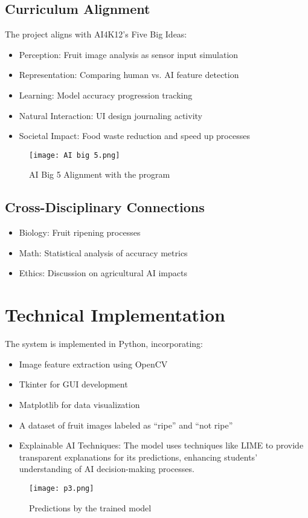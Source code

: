 \documentclass[conference]{IEEEtran}
\begin{document}
\subsection{Curriculum Alignment}
The project aligns with AI4K12's Five Big Ideas:
\begin{itemize}
    \item Perception: Fruit image analysis as sensor input simulation
    \item Representation: Comparing human vs. AI feature detection
    \item Learning: Model accuracy progression tracking
    \item Natural Interaction: UI design journaling activity
    \item Societal Impact: Food waste reduction and speed up processes
\end{itemize}
\begin{figure}[h]
    \centering
    \texttt{[image: AI big 5.png]}  
    \caption{AI Big 5 Alignment with the program}
    \label{fig:AI Big 5} 
\end{figure}
\subsection{Cross-Disciplinary Connections}
\begin{itemize}
    \item Biology: Fruit ripening processes
    \item Math: Statistical analysis of accuracy metrics
    \item Ethics: Discussion on agricultural AI impacts
\end{itemize}

\section{Technical Implementation}
The system is implemented in Python, incorporating:
\begin{itemize}
    \item Image feature extraction using OpenCV
    \item Tkinter for GUI development
    \item Matplotlib for data visualization
    \item A dataset of fruit images labeled as ``ripe'' and ``not ripe''
    \item Explainable AI Techniques: The model uses techniques like LIME to provide transparent explanations for its predictions, enhancing students' understanding of AI decision-making processes.
\end{itemize}
\begin{figure}[h]
    \centering
    \texttt{[image: p3.png]}  
    \caption{Predictions by the trained model}
    \label{fig: predictions} 
\end{figure}
\end{document}
